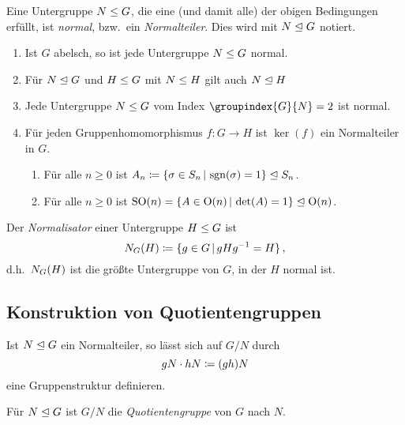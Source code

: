\begin{definition}
  Eine Untergruppe $N \mathrel{\leq} G$, die eine \textup(und damit alle\textup) der obigen Bedingungen erfüllt, ist \emph{normal}, bzw.\ ein \emph{Normalteiler}.
  Dies wird mit $N \mathrel{\trianglelefteq} G$ notiert.
\end{definition}

\begin{example}
  \begin{enumerate}
    \item
      Ist $G$ abelsch, so ist jede Untergruppe $N \mathrel{\leq} G$ normal.
    \item
      Für $N \mathrel{\trianglelefteq} G$ und $H \mathrel{\leq} G$ mit $N \mathrel{\leq} H$ gilt auch $N \mathrel{\trianglelefteq} H$
    \item
      Jede Untergruppe $N \mathrel{\leq} G$ vom Index $\groupindex{G}{N} = 2$ ist normal.
    \item
      Für jeden Gruppenhomomorphismus $f \colon G \to H$ ist $\ker(f)$ ein Normalteiler in $G$.
      \begin{enumerate}
        \item
          Für alle $n \geq 0$ ist $A_n \defined \{\sigma \in S_n \suchthat \sign(\sigma) = 1\} \normalgroup S_n$.
        \item
          Für alle $n \geq 0$ ist $\sorthogonal{n} = \{A \in \orthogonal{n} \suchthat \det(A) = 1\} \normalgroup \orthogonal{n}$.
      \end{enumerate}
  \end{enumerate}
\end{example}

\begin{definition}
  Der \emph{Normalisator} einer Untergruppe $H \mathrel{\leq} G$ ist
  \[
              \normalizer{G}{H}
    \defined  \{ g \in G \suchthat gHg^{-1} = H \} \,,
  \]
  d.h.\ $N_{G}(H)$ ist die größte Untergruppe von $G$, in der $H$ normal ist.
\end{definition}




\subsection{Konstruktion von Quotientengruppen}

Ist $N \mathrel{\trianglelefteq} G$ ein Normalteiler, so lässt sich auf $G/N$ durch
\[
            gN
  \cdot     hN
  \coloneqq  (gh)N
\]
eine Gruppenstruktur definieren.

\begin{definition}
  Für $N \mathrel{\trianglelefteq} G$ ist $G/N$ die \emph{Quotientengruppe} von $G$ nach $N$.
\end{definition}

